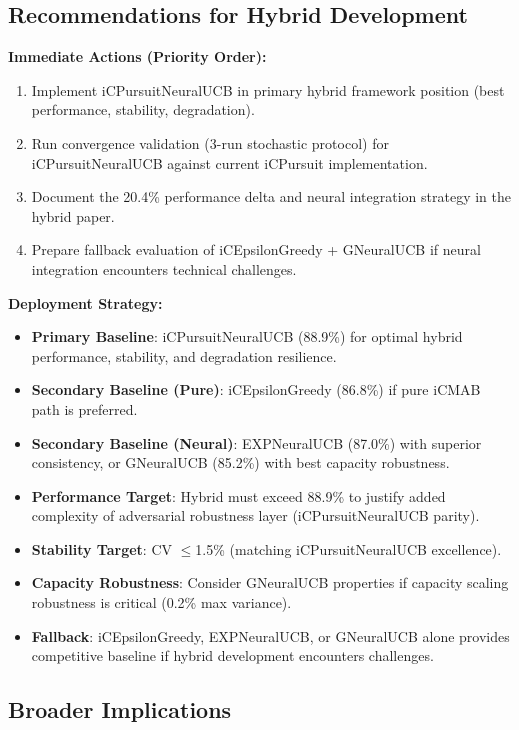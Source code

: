 \documentclass[12pt,a4paper]{article}
\begin{document}
\newpage
\subsection{Recommendations for Hybrid Development}

\textbf{Immediate Actions (Priority Order):}
\begin{enumerate}
\item Implement iCPursuitNeuralUCB in primary hybrid framework position (best performance, stability, degradation).
\item Run convergence validation (3-run stochastic protocol) for iCPursuitNeuralUCB against current iCPursuit implementation.
\item Document the 20.4\% performance delta and neural integration strategy in the hybrid paper.
\item Prepare fallback evaluation of iCEpsilonGreedy + GNeuralUCB if neural integration encounters technical challenges.
\end{enumerate}

\textbf{Deployment Strategy:}
\begin{itemize}
\item \textbf{Primary Baseline}: iCPursuitNeuralUCB (88.9\%) for optimal hybrid performance, stability, and degradation resilience.
\item \textbf{Secondary Baseline (Pure)}: iCEpsilonGreedy (86.8\%) if pure iCMAB path is preferred.
\item \textbf{Secondary Baseline (Neural)}: EXPNeuralUCB (87.0\%) with superior consistency, or GNeuralUCB (85.2\%) with best capacity robustness.
\item \textbf{Performance Target}: Hybrid must exceed 88.9\% to justify added complexity of adversarial robustness layer (iCPursuitNeuralUCB parity).
\item \textbf{Stability Target}: CV $\leq$1.5\% (matching iCPursuitNeuralUCB excellence).
\item \textbf{Capacity Robustness}: Consider GNeuralUCB properties if capacity scaling robustness is critical (0.2\% max variance).
\item \textbf{Fallback}: iCEpsilonGreedy, EXPNeuralUCB, or GNeuralUCB alone provides competitive baseline if hybrid development encounters challenges.
\end{itemize}

\subsection{Broader Implications}
\end{document}
